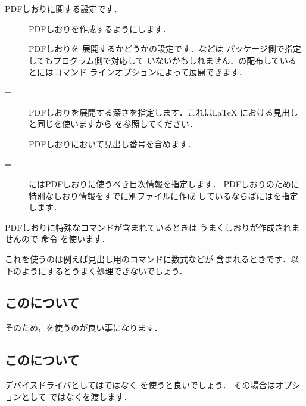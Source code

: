 PDFしおりに関する設定です．
\begin{description}
 \item[] PDFしおりを作成するようにします．
 \item[] PDFしおりを
展開するかどうかの設定です．などは
パッケージ側で指定してもプログラム側で対応して
いないかもしれません．の配布している
と\prog{\Dvipdfmx}にはコマンド
ラインオプションによって展開できます．
 \item[=] 
PDFしおりを展開する深さを指定します．これは{\LaTeX}
における見出しと同じを使いますから
を参照してください．
 \item[] 
PDFしおりにおいて見出し番号を含めます．%
 \item[=] 
にはPDFしおりに使うべき目次情報を指定します．
PDFしおりのために特別なしおり情報をすでに別ファイルに作成
しているならばにはを指定します．
\end{description}
PDFしおりに特殊なコマンドが含まれているときは
うまくしおりが作成されませんので 命令
を使います．
\begin{Syntax}
\end{Syntax}
これを使うのは例えば見出し用のコマンドに数式などが
含まれるときです．以下のようにするとうまく処理できないでしょう．

\begin{InTeX}
\section{この\hoge について}
\end{InTeX}

そのため，を使うのが良い事になります．

\begin{InTeX}
\section{このについて} 
\end{InTeX}



デバイスドライバとしてはではなく
\prog{\Dvipdfmx}を使うと良いでしょう．
その場合はオプションとして
ではなくを渡します．

